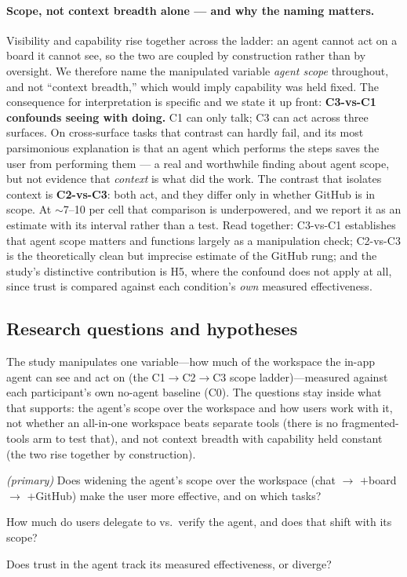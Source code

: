 \documentclass[11pt]{article}
\begin{document}
\paragraph{Scope, not context breadth alone --- and why the naming matters.}
Visibility and capability rise together across the ladder: an agent cannot act on
a board it cannot see, so the two are coupled by construction rather than by
oversight. We therefore name the manipulated variable \emph{agent scope}
throughout, and not ``context breadth,'' which would imply capability was held
fixed. The consequence for interpretation is specific and we state it up front:
\textbf{C3-vs-C1 confounds seeing with doing.} C1 can only talk; C3 can act
across three surfaces. On cross-surface tasks that contrast can hardly fail, and
its most parsimonious explanation is that an agent which performs the steps saves
the user from performing them --- a real and worthwhile finding about agent
scope, but not evidence that \emph{context} is what did the work. The contrast
that isolates context is \textbf{C2-vs-C3}: both act, and they differ only in
whether GitHub is in scope. At $\sim$7--10 per cell that comparison is
underpowered, and we report it as an estimate with its interval rather than a
test. Read together: C3-vs-C1 establishes that agent scope matters and functions
largely as a manipulation check; C2-vs-C3 is the theoretically clean but
imprecise estimate of the GitHub rung; and the study's distinctive contribution
is H5, where the confound does not apply at all, since trust is compared against
each condition's \emph{own} measured effectiveness.

\subsection*{Research questions and hypotheses}

The study manipulates one variable---how much of the workspace the in-app agent
can see and act on (the C1$\rightarrow$C2$\rightarrow$C3 scope ladder)---measured
against each participant's own no-agent baseline (C0). The questions stay inside
what that supports: the agent's scope over the workspace and how users work with
it, not whether an all-in-one workspace beats separate tools (there is no
fragmented-tools arm to test that), and not context breadth with capability held
constant (the two rise together by construction).

\begin{description}[leftmargin=2.6em,style=nextline,nosep]
  \item[RQ1] \emph{(primary)} Does widening the agent's scope over the workspace
  (chat $\rightarrow$ $+$board $\rightarrow$ $+$GitHub) make the user more
  effective, and on which tasks?
  \item[RQ2] How much do users delegate to vs.\ verify the agent, and does that
  shift with its scope?
  \item[RQ3] Does trust in the agent track its measured effectiveness, or diverge?
\end{description}
\end{document}
